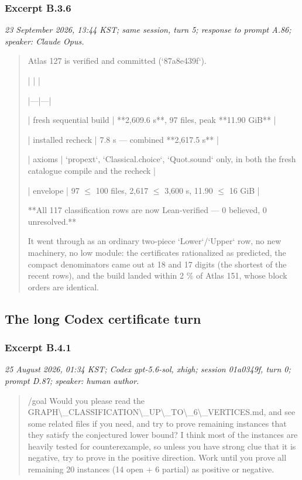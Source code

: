 \subsubsection*{Excerpt B.3.6}
\label{ex:B36}
\noindent\textit{23 September 2026, 13:44 KST; same session, turn 5; response to prompt A.86; speaker: Claude Opus.}
\begin{quote}\small\ttfamily\raggedright
Atlas 127 is verified and committed (`87a8e439f`).
\par
\medskip
| | |
\par
|---|---|
\par
| fresh sequential build | **2,609.6 s**, 97 files, peak **11.90 GiB** |
\par
| installed recheck | 7.8 s --- combined **2,617.5 s** |
\par
| axioms | `propext`, `Classical.choice`, `Quot.sound` only, in both the fresh catalogue compile and the recheck |
\par
| envelope | 97 \(\leq\) 100 files, 2,617 \(\leq\) 3,600 s, 11.90 \(\leq\) 16 GiB |
\par
\medskip
**All 117 classification rows are now Lean-verified --- 0 believed, 0 unresolved.**
\par
\medskip
It went through as an ordinary two-piece `Lower`/`Upper` row, no new machinery, no low module: the certificates rationalized as predicted, the compact denominators came out at 18 and 17 digits (the shortest of the recent rows), and the build landed within 2 \% of Atlas 151, whose block orders are identical.
\par
\end{quote}

\subsection{The long Codex certificate turn}
\subsubsection*{Excerpt B.4.1}
\label{ex:B41}
\noindent\textit{25 August 2026, 01:34 KST; Codex gpt-5.6-sol, xhigh; session 01a0349f, turn 0; prompt D.87; speaker: human author.}
\begin{quote}\small\ttfamily\raggedright
/goal Would you please read the GRAPH\textbackslash{}\_CLASSIFICATION\textbackslash{}\_UP\textbackslash{}\_TO\textbackslash{}\_6\textbackslash{}\_VERTICES.md, and see some related files if you need, and try to prove remaining instances that they satisfy the conjectured lower bound? I think most of the instances are heavily tested for counterexample, so unless you have strong clue that it is negative, try to prove in the positive direction. Work until you prove all remaining 20 instances (14 open + 6 partial) as positive or negative.
\par
\end{quote}

